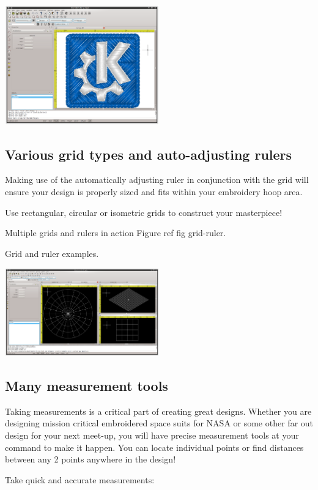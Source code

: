 \documentclass[11pt]{report}
\begin{document}
\includegraphics[width=0.5\textwidth]{images/features-realrender-3.png}

\subsection{Various grid types and auto-adjusting rulers}

Making use of the automatically adjusting ruler in conjunction with the grid will ensure your
design is properly sized and fits within your embroidery hoop area.

Use rectangular, circular or isometric grids to construct your masterpiece!

Multiple grids and rulers in action Figure ref fig grid-ruler.

Grid and ruler examples.

\includegraphics[width=0.5\textwidth]{images/features-grid-ruler-1.png}

\subsection{Many measurement tools}

Taking measurements is a critical part of creating great designs. Whether you are designing
mission critical embroidered space suits for NASA or some other far out design for your next
meet-up, you will have precise measurement tools at your command to make it happen. You can
locate individual points or find distances between any 2 points anywhere in the design!

Take quick and accurate measurements:
\end{document}
